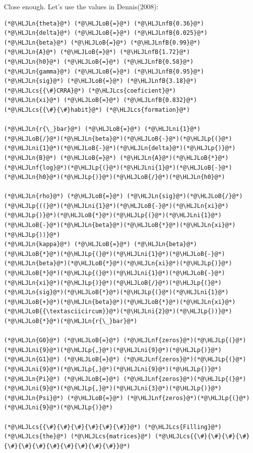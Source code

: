 \documentclass[12pt,a4paper]{article}
\newcommand{\HLJLn}[1]{#1}
\newcommand{\HLJLnf}[1]{\textcolor[RGB]{66,102,213}{#1}}
\newcommand{\HLJLnfB}[1]{\textcolor[RGB]{59,151,46}{#1}}
\newcommand{\HLJLni}[1]{\textcolor[RGB]{59,151,46}{#1}}
\newcommand{\HLJLoB}[1]{\textcolor[RGB]{102,102,102}{\textbf{#1}}}
\newcommand{\HLJLp}[1]{#1}
\newcommand{\HLJLcs}[1]{\textcolor[RGB]{153,153,119}{\textit{#1}}}
\begin{document}
Close enough. Let's use the values in Dennis(2008):


\begin{lstlisting}
(*@\HLJLn{theta}@*) (*@\HLJLoB{=}@*) (*@\HLJLnfB{0.36}@*)
(*@\HLJLn{delta}@*) (*@\HLJLoB{=}@*) (*@\HLJLnfB{0.025}@*)
(*@\HLJLn{beta}@*) (*@\HLJLoB{=}@*) (*@\HLJLnfB{0.99}@*)
(*@\HLJLn{A}@*) (*@\HLJLoB{=}@*) (*@\HLJLnfB{1.72}@*)
(*@\HLJLn{h0}@*) (*@\HLJLoB{=}@*) (*@\HLJLnfB{0.58}@*)
(*@\HLJLn{gamma}@*) (*@\HLJLoB{=}@*) (*@\HLJLnfB{0.95}@*)
(*@\HLJLn{sig}@*) (*@\HLJLoB{=}@*) (*@\HLJLnfB{3.18}@*) (*@\HLJLcs{{\#}CRRA}@*) (*@\HLJLcs{coeficient}@*)
(*@\HLJLn{xi}@*) (*@\HLJLoB{=}@*) (*@\HLJLnfB{0.832}@*) (*@\HLJLcs{{\#}{\#}habit}@*) (*@\HLJLcs{formation}@*)

(*@\HLJLn{r{\_}bar}@*) (*@\HLJLoB{=}@*) (*@\HLJLni{1}@*)(*@\HLJLoB{/}@*)(*@\HLJLn{beta}@*)(*@\HLJLoB{-}@*)(*@\HLJLp{(}@*)(*@\HLJLni{1}@*)(*@\HLJLoB{-}@*)(*@\HLJLn{delta}@*)(*@\HLJLp{)}@*)
(*@\HLJLn{B}@*) (*@\HLJLoB{=}@*) (*@\HLJLn{A}@*)(*@\HLJLoB{*}@*)(*@\HLJLnf{log}@*)(*@\HLJLp{(}@*)(*@\HLJLni{1}@*)(*@\HLJLoB{-}@*)(*@\HLJLn{h0}@*)(*@\HLJLp{)}@*)(*@\HLJLoB{/}@*)(*@\HLJLn{h0}@*)

(*@\HLJLn{rho}@*) (*@\HLJLoB{=}@*) (*@\HLJLn{sig}@*)(*@\HLJLoB{/}@*)(*@\HLJLp{((}@*)(*@\HLJLni{1}@*)(*@\HLJLoB{-}@*)(*@\HLJLn{xi}@*)(*@\HLJLp{)}@*)(*@\HLJLoB{*}@*)(*@\HLJLp{(}@*)(*@\HLJLni{1}@*)(*@\HLJLoB{-}@*)(*@\HLJLn{beta}@*)(*@\HLJLoB{*}@*)(*@\HLJLn{xi}@*)(*@\HLJLp{))}@*)
(*@\HLJLn{kappa}@*) (*@\HLJLoB{=}@*) (*@\HLJLn{beta}@*)(*@\HLJLoB{*}@*)(*@\HLJLp{(}@*)(*@\HLJLni{1}@*)(*@\HLJLoB{-}@*)(*@\HLJLn{beta}@*)(*@\HLJLoB{*}@*)(*@\HLJLn{xi}@*)(*@\HLJLp{)}@*)(*@\HLJLoB{*}@*)(*@\HLJLp{(}@*)(*@\HLJLni{1}@*)(*@\HLJLoB{-}@*)(*@\HLJLn{xi}@*)(*@\HLJLp{)}@*)(*@\HLJLoB{/}@*)(*@\HLJLp{(}@*)(*@\HLJLn{sig}@*)(*@\HLJLoB{*}@*)(*@\HLJLp{(}@*)(*@\HLJLni{1}@*)(*@\HLJLoB{+}@*)(*@\HLJLn{beta}@*)(*@\HLJLoB{*}@*)(*@\HLJLn{xi}@*)(*@\HLJLoB{{\textasciicircum}}@*)(*@\HLJLni{2}@*)(*@\HLJLp{))}@*)(*@\HLJLoB{*}@*)(*@\HLJLn{r{\_}bar}@*)

(*@\HLJLn{G0}@*) (*@\HLJLoB{=}@*) (*@\HLJLnf{zeros}@*)(*@\HLJLp{(}@*)(*@\HLJLni{9}@*)(*@\HLJLp{,}@*)(*@\HLJLni{9}@*)(*@\HLJLp{)}@*)
(*@\HLJLn{G1}@*) (*@\HLJLoB{=}@*) (*@\HLJLnf{zeros}@*)(*@\HLJLp{(}@*)(*@\HLJLni{9}@*)(*@\HLJLp{,}@*)(*@\HLJLni{9}@*)(*@\HLJLp{)}@*)
(*@\HLJLn{Pi}@*) (*@\HLJLoB{=}@*) (*@\HLJLnf{zeros}@*)(*@\HLJLp{(}@*)(*@\HLJLni{9}@*)(*@\HLJLp{,}@*)(*@\HLJLni{3}@*)(*@\HLJLp{)}@*)
(*@\HLJLn{Psi}@*) (*@\HLJLoB{=}@*) (*@\HLJLnf{zeros}@*)(*@\HLJLp{(}@*)(*@\HLJLni{9}@*)(*@\HLJLp{)}@*)

(*@\HLJLcs{{\#}{\#}{\#}{\#}{\#}{\#}}@*) (*@\HLJLcs{Filling}@*) (*@\HLJLcs{the}@*) (*@\HLJLcs{matrices}@*) (*@\HLJLcs{{\#}{\#}{\#}{\#}{\#}{\#}{\#}{\#}{\#}{\#}{\#}{\#}}@*)


\end{lstlisting}
\end{document}
